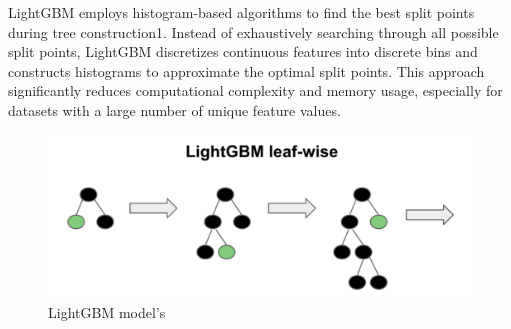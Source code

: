 \documentclass{ieeeojies}
\begin{document}
 LightGBM employs histogram-based algorithms to find the best split points during tree construction1. Instead of exhaustively searching through all possible split points, LightGBM discretizes continuous features into discrete bins and constructs histograms to approximate the optimal split points. This approach significantly reduces computational complexity and memory usage, especially for datasets with a large number of unique feature values.

 \begin{figure}[H]
  \centering
  \begin{minipage}{0.8\linewidth}
    \centering
    \includegraphics[width=\linewidth]{bibliography/Figure/LightGBM_model.png}
    \caption{LightGBM model's}
    \label{fig8}
  \end{minipage}
\end{figure}
 
\end{document}
